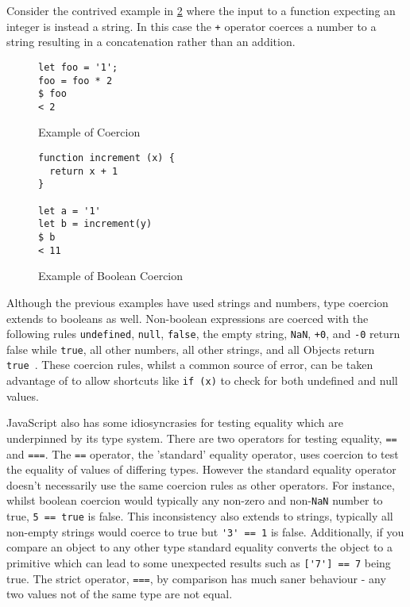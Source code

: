 \documentclass[]{final_report}
\begin{document}
Consider the contrived example in \ref{fig:js-bool-coercion} where the input to a function expecting an integer is instead a string. In this case the \lstinline{+} operator coerces a number to a string resulting in a concatenation rather than an addition.

\begin{figure}[h]
\begin{verbatim}
let foo = '1';
foo = foo * 2
$ foo
< 2
\end{verbatim}
\caption{\label{fig:js-coercion} Example of Coercion}
\end{figure} 

\begin{figure}[h]
\begin{verbatim}
function increment (x) {
  return x + 1
}

let a = '1'
let b = increment(y)
$ b
< 11
\end{verbatim}
\caption{\label{fig:js-bool-coercion} Example of Boolean Coercion}
\end{figure} 

Although the previous examples have used strings and numbers, type coercion extends to booleans as well. Non-boolean expressions are coerced with the following rules \lstinline{undefined}, \lstinline{null}, \lstinline{false}, the empty string, \lstinline{NaN}, \lstinline{+0}, and \lstinline{-0}  return false while \lstinline{true}, all other numbers, all other strings, and all Objects return \lstinline{true}~\cite{EcmaScript}. These coercion rules, whilst a common source of error, can be taken advantage of to allow shortcuts like \lstinline{if (x)} to check for both undefined and null values.

JavaScript also has some idiosyncrasies for testing equality which are underpinned by its type system. There are two operators for testing equality, \lstinline{==} and \lstinline{===}.  The \lstinline{==} operator, the 'standard' equality operator, uses coercion to test the equality of values of differing types. However the standard equality operator doesn't necessarily use the same coercion rules as other operators. For instance, whilst boolean coercion would typically any non-zero and non-\lstinline{NaN} number to true,  \lstinline{5 == true} is false. This inconsistency also extends to strings, typically all non-empty strings would coerce to true but \lstinline{'3' == 1} is false. Additionally, if you compare an object to any other type standard equality converts the object to a primitive which can lead to some unexpected results such as \lstinline{['7'] == 7}  being true. The strict operator, \lstinline{===}, by comparison has much saner behaviour - any two values not of the same type are not equal.
\end{document}
